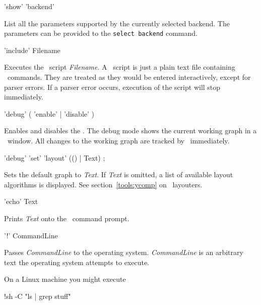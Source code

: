 \begin{rail}
  'show' 'backend'
\end{rail}
List all the parameters supported by the currently selected backend. The parameters can be provided to the \texttt{select backend} command.

\begin{rail}
  'include' Filename
\end{rail}
Executes the \GrShell\ script \emph{Filename}. A \GrShell\ script is just a plain text file containing \GrShell\ commands. They are treated as they would be entered interactively, except for parser errors. If a parser error occurs, execution of the script will stop immediately.

\begin{rail}
  'debug' ( 'enable' | 'disable' )
\end{rail}
Enables and disables the . The debug mode shows the current working graph in a \yComp\ window. All changes to the working graph are tracked by \yComp\ immediately.  

\begin{rail}
  'debug' 'set' 'layout' (() | Text) ;
\end{rail}
Sets the default graph  to \emph{Text}. If \emph{Text} is omitted, a list of available layout algorithms is displayed. See section~\ref{tools:ycomp} on \yComp\ layouters.

\begin{rail}
  'echo' Text
\end{rail}
Prints \emph{Text} onto the \GrShell\ command prompt.

\begin{rail}
  '!' CommandLine
\end{rail}
Passes \emph{CommandLine} to the operating system. \emph{CommandLine} is an arbitrary text the operating system attempts to execute.
\begin{example}
On a Linux machine you might execute
\begin{grshell}
!sh -C "ls | grep stuff"
\end{grshell}
\end{example}

